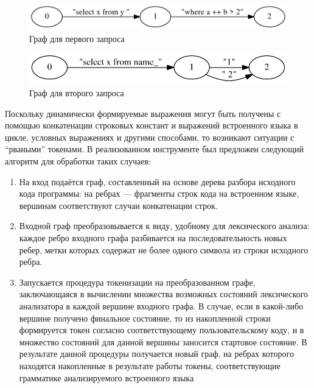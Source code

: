 \begin{figure}[t]
\centering
\includegraphics[width=\textwidth]{Polubelova/Graph1}
\caption{Граф для первого запроса}
\label{fig:Graph1} 
\end{figure}

\begin{figure}[t]
\centering
\includegraphics[width=\textwidth]{Polubelova/Graph2}
\caption{Граф для второго запроса}
\label{fig:Graph2} 
\end{figure}

Поскольку динамически формируемые выражения могут быть получены с помощью конкатенации строковых констант и выражений встроенного языка в цикле, 
условных выражениях и другими способами, то возникают ситуации с ``рваными'' токенами. В реализованном инструменте был предложен следующий алгоритм 
для обработки таких случаев:

\begin{enumerate}
\item	На вход подаётся граф, составленный на основе дерева разбора исходного кода программы: на ребрах — фрагменты строк кода на встроенном языке, 
вершинам соответствуют случаи конкатенации строк.
\item	Входной граф преобразовывается к виду, удобному для лексического анализа: каждое ребро входного графа разбивается на последовательность новых 
ребер, метки которых содержат не более одного символа из строки исходного ребра.
\item   Запускается процедура токенизации на преобразованном графе, заключающаяся в вычислении множества возможных состояний лексического анализатора
в каждой вершине входного графа. В случае, если в какой-либо вершине получено финальное состояние, то из накопленной строки формируется токен согласно 
соответствующему пользовательскому коду, и в множество состояний для данной вершины заносится стартовое состояние. В результате данной процедуры получается
новый граф, на ребрах которого находятся накопленные в результате работы токены, соответствующие грамматике анализируемого встроенного языка
\end{enumerate}

